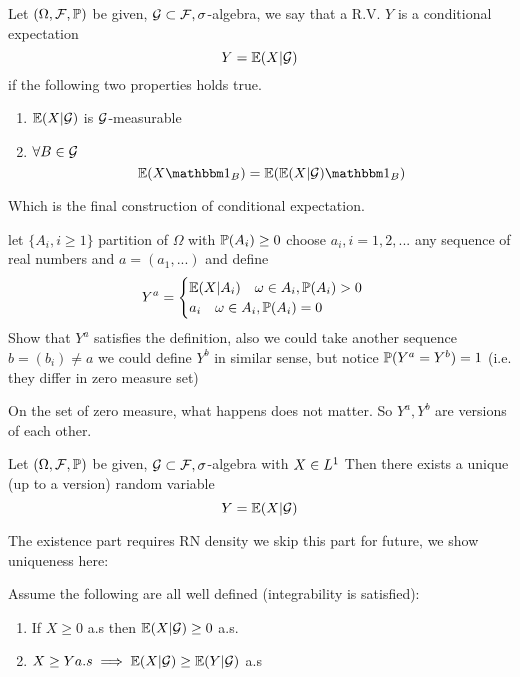 \newpage
\begin{dfn}
Let $(\Omega, \mathcal{F}, \mathbb{P})$ be given, $\mathcal{G} \subset\mathcal{F},\sigma$-algebra, we say that a R.V. $Y$ is a conditional expectation \begin{equation*}
    Y = \mathbb{E}(X|\mathcal{G})
\end{equation*} if the following two properties holds true. \begin{enumerate}
    \item $\mathbb{E}(X|\mathcal{G})$ is $\mathcal{G}$-measurable
    \item $\forall B\in \mathcal{G}$ \begin{equation*}
        \E(X \I_B) = \E(\E(X|\setg) \I_B)
    \end{equation*}
\end{enumerate}
\end{dfn}Which is the final construction of conditional expectation.
\begin{ex}
let $\{A_i, i\geq1\}$ partition of $\Omega$ with $\mathbb{P}(A_i) \geq 0$ choose $a_i, i=1,2,...$ any sequence of real numbers and $a = (a_1, ...)$ and define 
\begin{equation*}
    Y^a = \begin{cases} \mathbb{E}(X|A_i) \quad \omega\in A_i, \mathbb{P}(A_i)>0 \\
    a_i\quad \omega\in A_i, \mathbb{P}(A_i) = 0
    \end{cases}
\end{equation*}Show that $Y^a$ satisfies the definition, also we could take another sequence $b = (b_i)\neq a$ we could define $Y^b$ in similar sense, but notice $\mathbb{P}(Y^a = Y^b) = 1$ (i.e. they differ in zero measure set)
\end{ex}
\begin{rem}[Versions]
On the set of zero measure, what happens does not matter. So $Y^a, Y^b$ are versions of each other.
\end{rem}

\begin{thm}
Let $(\Omega, \mathcal{F}, \mathbb{P})$ be given, $\mathcal{G} \subset\mathcal{F},\sigma$-algebra with $X\in L^{1}$ Then there exists a unique (up to a version) random variable
\begin{equation*}
    Y = \mathbb{E}(X|\mathcal{G})
\end{equation*}
\end{thm}The existence part requires RN density we skip this part for future, we show uniqueness here:

\begin{cor}
Assume the following are all well defined (integrability is satisfied):
\begin{enumerate}
    \item If $X\geq 0$ a.s then $\mathbb{E}(X|\mathcal{G}) \geq 0$ a.s.
    \item $X \geq Y a.s \implies \mathbb{E}(X|\mathcal{G}) \geq \mathbb{E}(Y|\mathcal{G})$ a.s
\end{enumerate}
\end{cor}

